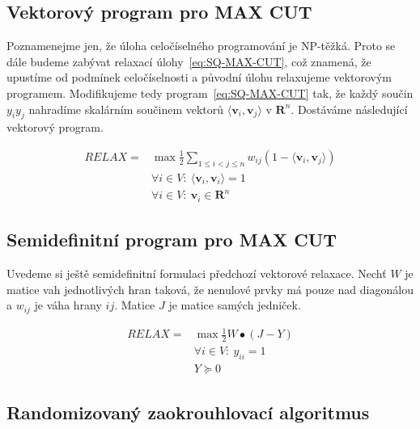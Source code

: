 \subsection*{Vektorový program pro MAX CUT}

Poznamenejme jen, že úloha celočíselného programování je NP-těžká. Proto se dále budeme zabývat relaxací úlohy~\ref{eq:SQ-MAX-CUT}, což znamená, že upustíme od podmínek celočíselnosti a původní úlohu relaxujeme vektorovým programem. Modifikujeme tedy program~\ref{eq:SQ-MAX-CUT} tak, že každý součin $y_i y_j$ nahradíme skalárním součinem vektorů $\langle \mathbf{v}_i, \mathbf{v}_j \rangle$ v $\mathbf{R}^n$. Dostáváme následující vektorový program.

\begin{equation}\tag{V-MAX-CUT}
    \begin{split}
        RELAX = &\max \frac{1}{2} \sum_{1 \leq i < j \leq n} w_{ij} (1 - \langle \mathbf{v}_i, \mathbf{v}_j \rangle) \\
        &\forall i \in V:\ \langle \mathbf{v}_i, \mathbf{v}_i \rangle = 1 \\
        &\forall i \in V:\ \mathbf{v}_i \in \mathbf{R}^n
    \end{split}
    \label{eq:V-MAX-CUT}
\end{equation}


\subsection*{Semidefinitní program pro MAX CUT}

Uvedeme si ještě semidefinitní formulaci předchozí vektorové relaxace. Nechť $W$ je matice vah jednotlivých hran taková, že nenulové prvky má pouze nad diagonálou a $w_{ij}$ je váha hrany $ij$. Matice $J$ je matice samých jedniček.

\begin{equation}\tag{SDP-MAX-CUT}
    \begin{split}
        RELAX = &\max \frac{1}{2} W \bullet (J - Y) \\
        &\forall i \in V:\ y_{ii} = 1 \\
        &Y \succeq 0
    \end{split}
    \label{eq:SDP-MAX-CUT}
\end{equation}

\subsection*{Randomizovaný zaokrouhlovací algoritmus}

